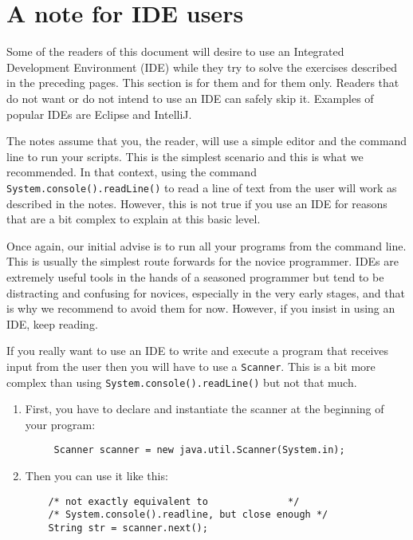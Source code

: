 
\section{A note for IDE users}
\label{sec:note-ide-users}

Some of the readers of this document will desire to use an Integrated
Development Environment (IDE) while they try to solve the exercises
described in the preceding pages. This section is for them and for
them only. Readers that do not want or do not intend to use an IDE can
safely skip it. Examples of popular IDEs are Eclipse and IntelliJ. 

The notes assume that you, the reader, will use a simple editor and
the command line to run your scripts. This is the simplest scenario
and this is what we recommended. In that context, using the command
\verb+System.console().readLine()+ to read a line of text from the
user will work as described in the notes. However, this is not true if
you use an IDE for reasons that are a bit complex to explain at this
basic level.

Once again, our initial advise is to run all your programs from the
command line. This is usually the simplest route forwards for the
novice programmer. IDEs are extremely useful tools in the hands of a
seasoned programmer but tend to be distracting and confusing for
novices, especially in the very early stages, and that is why we
recommend to avoid them for now. However, if you insist in using an
IDE, keep reading. 

If you really want to use an IDE to write and execute a program that
receives input from the user then you will have to use a
\verb+Scanner+. This is a bit more complex than using
\verb+System.console().readLine()+ but not that much.

\begin{enumerate}
\item First, you have to declare and instantiate the scanner at the
beginning of your program:

\begin{verbatim}
     Scanner scanner = new java.util.Scanner(System.in);
\end{verbatim}

\item Then you can use it like this:

\begin{verbatim}
    /* not exactly equivalent to              */
    /* System.console().readline, but close enough */
    String str = scanner.next();
\end{verbatim}

\end{enumerate}


